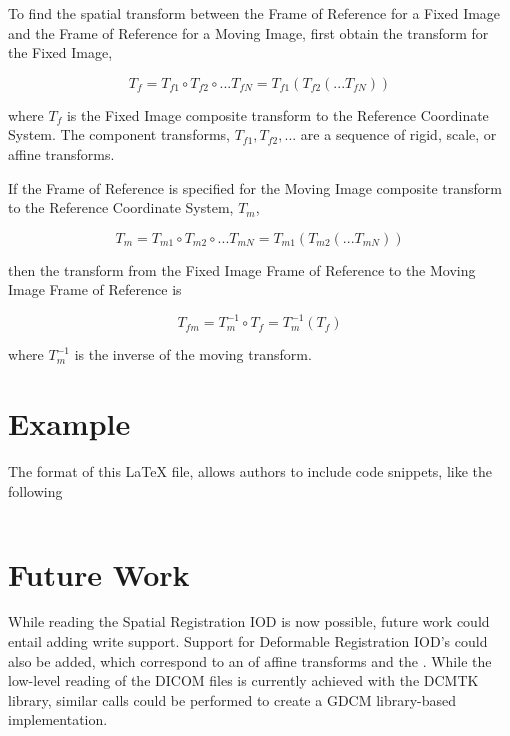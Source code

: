 \documentclass{InsightArticle}
\begin{document}
To find the spatial transform between the Frame of Reference for a Fixed Image
and the Frame of Reference for a Moving Image, first obtain the transform for
the Fixed Image,

\begin{equation}
  T_f = T_{f1} \circ T_{f2} \circ ... T_{fN} = T_{f1}( T_{f2}( ... T_{fN} ))
\end{equation}

where $T_f$ is the Fixed Image composite transform to the Reference Coordinate
System. The component transforms, $T_{f1}, T_{f2}, ...$ are a sequence of
rigid, scale, or affine transforms.

If the Frame of Reference is specified for the Moving Image composite
transform to the Reference Coordinate System, $T_m$,

\begin{equation}
  T_m = T_{m1} \circ T_{m2} \circ ... T_{mN} = T_{m1}( T_{m2}( ... T_{mN} ))
\end{equation}

then the transform from the Fixed Image Frame of Reference to the Moving Image
Frame of Reference is

\begin{equation}
  T_{fm} = T_m^{-1} \circ T_f = T_m^{-1}( T_f )
\end{equation}

where $T_m^{-1}$ is the inverse of the moving transform.

\section{Example}

The format of this LaTeX file, allows authors to include code snippets, like
the following

\inputminted[baselinestretch=1,fontsize=\footnotesize,linenos=false]{c++}{Module/test/ReadDicomTransformAndResampleExample.cxx}


\section{Future Work}

While reading the Spatial Registration IOD is now possible, future work could
entail adding write support. Support for Deformable Registration IOD's could
also be added, which correspond to an  of affine
transforms and the .  While the low-level
reading of the DICOM files is currently achieved with the DCMTK library, similar
calls could be performed to create a GDCM library-based implementation.




\end{document}

